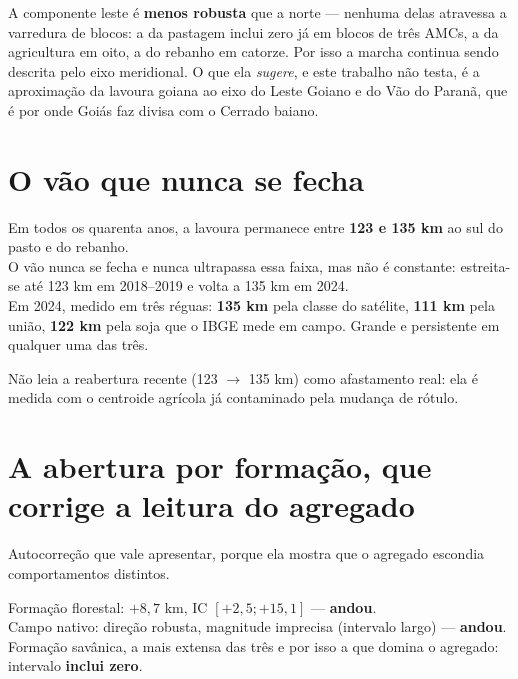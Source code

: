 \begin{naodiz}
A componente leste é \textbf{menos robusta} que a norte --- nenhuma delas
atravessa a varredura de blocos: a da pastagem inclui zero já em blocos de três
AMCs, a da agricultura em oito, a do rebanho em catorze. Por isso a marcha continua
sendo descrita pelo eixo meridional. O que ela \emph{sugere}, e este trabalho
não testa, é a aproximação da lavoura goiana ao eixo do Leste Goiano e do Vão do
Paranã, que é por onde Goiás faz divisa com o Cerrado baiano.
\end{naodiz}

\section{O vão que nunca se fecha}

\begin{ancora}
Em todos os quarenta anos, a lavoura permanece entre \textbf{123 e 135 km} ao
sul do pasto e do rebanho. \\
O vão nunca se fecha e nunca ultrapassa essa faixa, mas não é constante:
estreita-se até 123 km em 2018--2019 e volta a 135 km em 2024. \\[4pt]
Em 2024, medido em três réguas: \textbf{135 km} pela classe do satélite,
\textbf{111 km} pela união, \textbf{122 km} pela soja que o IBGE mede em campo.
Grande e persistente em qualquer uma das três.
\end{ancora}

\begin{armadilha}
Não leia a reabertura recente (123 $\to$ 135 km) como afastamento real: ela é
medida com o centroide agrícola já contaminado pela mudança de rótulo.
\end{armadilha}

\section{A abertura por formação, que corrige a leitura do agregado}

Autocorreção que vale apresentar, porque ela mostra que o agregado escondia
comportamentos distintos.

\begin{ancora}
Formação florestal: $+8{,}7$ km, IC $[+2{,}5; +15{,}1]$ --- \textbf{andou}. \\
Campo nativo: direção robusta, magnitude imprecisa (intervalo largo) ---
\textbf{andou}. \\
Formação savânica, a mais extensa das três e por isso a que domina o agregado:
intervalo \textbf{inclui zero}.
\end{ancora}

